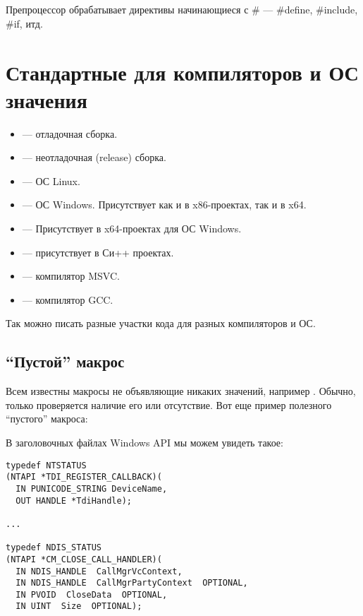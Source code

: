 ﻿\section{}

Препроцессор обрабатывает директивы начинающиеся с \# --- \#define, \#include, \#if, итд.

\section{Стандартные для компиляторов и ОС значения}

\begin{itemize}
\item {} --- отладочная сборка.
\item {} --- неотладочная (release) сборка.
\item {} --- ОС Linux.
\item {} --- ОС Windows. Присутствует как и в x86-проектах, так и в x64.
\item {} --- Присутствует в x64-проектах для ОС Windows.
\item {} --- присутствует в Си++ проектах.
\item {} --- компилятор MSVC.
\item {} --- компилятор GCC.
\end{itemize}

Так можно писать разные участки кода для разных компиляторов и ОС.

\subsection{``Пустой'' макрос}

Всем известны макросы не объявляющие никаких значений, например .
Обычно, только проверяется наличие его или отсутствие.
Вот еще пример полезного ``пустого'' макроса:

В заголовочных файлах Windows API мы можем увидеть такое:

\begin{lstlisting}
typedef NTSTATUS
(NTAPI *TDI_REGISTER_CALLBACK)(
  IN PUNICODE_STRING DeviceName,
  OUT HANDLE *TdiHandle);

...

typedef NDIS_STATUS
(NTAPI *CM_CLOSE_CALL_HANDLER)(
  IN NDIS_HANDLE  CallMgrVcContext,
  IN NDIS_HANDLE  CallMgrPartyContext  OPTIONAL,
  IN PVOID  CloseData  OPTIONAL,
  IN UINT  Size  OPTIONAL);
\end{lstlisting}

